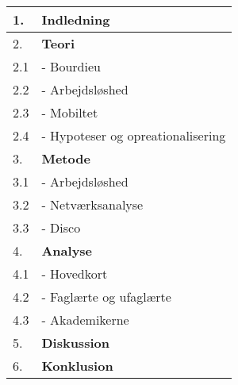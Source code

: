 \begin{table}[h] 
\begin{tabular}{@{}||l||l||@{}} \hline \hline 
  1.  & \textbf{Indledning} \\ \hline \hline 
  2.  & \textbf{Teori} \\ 
  2.1 & - Bourdieu \\ 
  2.2 & - Arbejdsløshed \\ 
  2.3 & - Mobiltet \\ 
  2.4 & - Hypoteser og opreationalisering \\ \hline \hline 
  3.  & \textbf{Metode}  \\ 
  3.1 & - Arbejdsløshed  \\ 
  3.2 & - Netværksanalyse  \\ 
  3.3 & - Disco \\ \hline \hline 
  4.  & \textbf{Analyse}  \\ 
  4.1 & - Hovedkort  \\ 
  4.2 & - Faglærte og ufaglærte  \\ 
  4.3 & - Akademikerne  \\ \hline \hline 
  5.  & \textbf{Diskussion}  \\ \hline \hline 
  6.  & \textbf{Konklusion}  \\ \hline \hline 
\end{tabular} \end{table}





